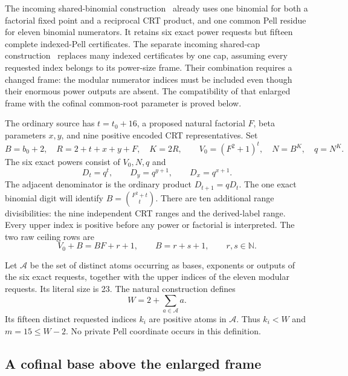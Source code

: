 The incoming shared-binomial construction~\cite{binomial} already uses one binomial
for both a factorial fixed point and a reciprocal CRT product, and
one common Pell residue for eleven binomial numerators.  It retains
six exact power requests but fifteen complete indexed-Pell certificates.
The separate incoming shared-cap construction~\cite{cap} replaces many indexed
certificates by one cap, assuming every requested index belongs to its
power-size frame.  Their combination requires a changed frame: the
modular numerator indices must be included even though their enormous
power outputs are absent.  The compatibility of that enlarged frame
with the cofinal common-root parameter is proved below.

The ordinary source has $t=t_0+16$, a proposed natural factorial $F$,
beta parameters $x,y$, and nine positive encoded CRT representatives.
Set
\[
 B=b_0+2,\quad R=2+t+x+y+F,\quad K=2R,
 \qquad V_0=(F^2+1)^t,\quad N=B^K,\quad q=N^K.
\]
The six exact powers consist of $V_0,N,q$ and
\[
 D_t=q^t,\qquad D_y=q^{y+1},\qquad D_x=q^{x+1}.
\]
The adjacent denominator is the ordinary product
$D_{t+1}=qD_t$.  The one exact binomial digit will identify
$B=\binom{F^2+t}{t}$.  There are ten additional range divisibilities:
the nine independent CRT ranges and the derived-label range.
Every upper index is positive before any power or factorial is
interpreted.  The two raw ceiling rows are
\begin{equation}
 V_0+B=BF+r+1,\qquad B=r+s+1,
 \qquad r,s\in\mathbb N.
 \label{eq:direct-ceiling}
\end{equation}

Let $\mathcal A$ be the set of distinct atoms occurring as bases,
exponents or outputs of the six exact requests, together with the
upper indices of the eleven modular requests.  Its literal size is 23.
The natural construction defines
\begin{equation}
 W=2+\sum_{a\in\mathcal A}a.
 \label{eq:direct-natural-frame}
\end{equation}
Its fifteen distinct requested indices $k_i$ are positive atoms in
$\mathcal A$. Thus $k_i<W$ and $m=15\le W-2$.  No private Pell
coordinate occurs in this definition.

\subsection{A cofinal base above the enlarged frame}

